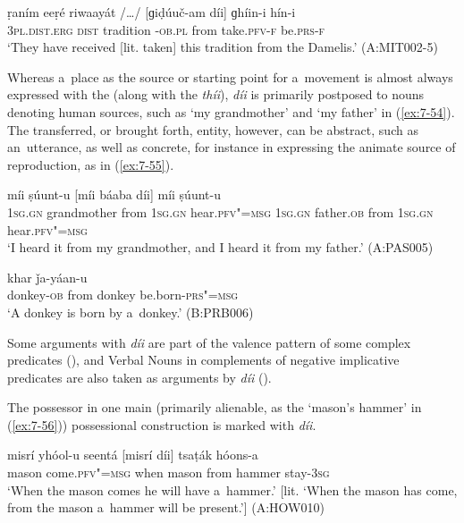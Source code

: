 \begin{exe}
\ex
\label{ex:7-53}
\gll ṛaním eeṛé riwaayát /{\ldots}/ [ɡiḍúuč-am díi]  ɡhíin-i hín-i \\
\textsc{3pl.dist.erg} \textsc{dist} tradition {} -\textsc{ob.pl} from take.\textsc{pfv-f} be.\textsc{prs-f}\\
\glt `They have received [lit. taken] this tradition from the Damelis.' (A:MIT002-5)
\end{exe}

Whereas a~place as the source or starting point for a~movement is almost always expressed with the  (along with the  \textit{thíi}), \textit{díi} is primarily postposed to nouns denoting human sources, such as `my grandmother' and `my father' in (\ref{ex:7-54}). The transferred, or brought forth, entity, however, can be abstract, such as an~utterance, as well as concrete, for instance in expressing the animate source of reproduction, as in (\ref{ex:7-55}).

\begin{exe}
\ex
\label{ex:7-54}
 míi ṣúunt-u [míi  báaba díi] míi
ṣúunt-u \\
\textsc{1sg.gn} grandmother from \textsc{1sg.gn} hear.\textsc{pfv"=msg} \textsc{1sg.gn} father.\textsc{ob} from \textsc{1sg.gn} hear.\textsc{pfv"=msg}\\
\glt `I heard it from my grandmother, and I heard it from my father.' (A:PAS005)

\ex
\label{ex:7-55}
 khar ǰa-yáan-u \\
donkey-\textsc{ob} from donkey be.born\textsf{-}\textsc{prs"=msg} \\
\glt `A donkey is born by a~donkey.' (B:PRB006)
\end{exe}

Some arguments with \textit{díi} are part of the valence pattern of some complex predicates (), and Verbal Nouns in complements of negative implicative predicates are also taken as arguments by \textit{díi} ().


The possessor in one main (primarily alienable, as the `mason's hammer' in (\ref{ex:7-56})) possessional construction is marked with \textit{díi}.

\begin{exe}
\ex
\label{ex:7-56}
\gll misrí yhóol-u seentá [misrí díi] tsaṭák hóons-a \\
mason come.\textsc{pfv"=msg} when mason from hammer stay-\textsc{3sg} \\
\glt `When the mason comes he will have a~hammer.' [lit. `When the mason has come, from the mason a~hammer will be present.'] (A:HOW010)
\end{exe}

